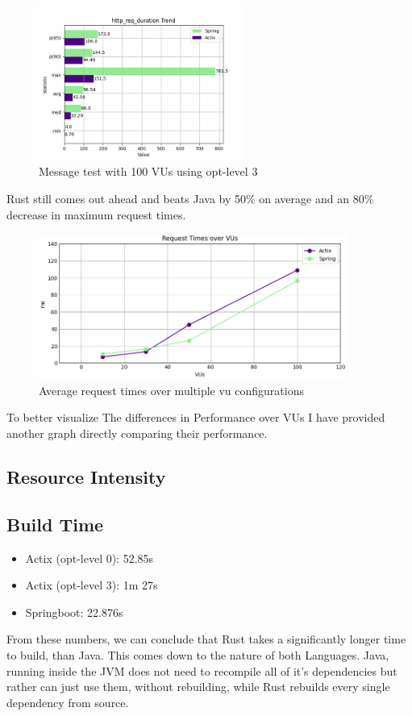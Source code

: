 \documentclass[a4paper,12pt]{article}
\begin{document}
	\clearpage
	\newpage
	\begin{figure}[ht!]
		\begin{center}
			\includegraphics[width=0.6\textwidth]{messages_100_opt_3/http_req_duration.png}
			\caption{Message test with 100 VUs using opt-level 3}
		\end{center}
	\end{figure}
	Rust still comes out ahead and beats Java by 50\% on average and an 80\% decrease in maximum request times.
	
	\begin{figure}[h]
		\begin{center}
			\includegraphics[width=0.9\textwidth]{requests_over_time.png}
			\caption{Average request times over multiple vu configurations}
		\end{center}
	\end{figure}
	To better visualize The differences in Performance over VUs I have provided another graph directly comparing their performance.
	\newpage
	\clearpage

	\subsection{Resource Intensity}
	\label{subsec:resource_intensity}
	\subsection*{Build Time}
	\begin{itemize}
		\item Actix (opt-level 0): 52.85s
		\item Actix (opt-level 3): 1m 27s
		\item Springboot: 22.876s
	\end{itemize}
	From these numbers, we can conclude that Rust takes a significantly longer time to build, than Java. This comes down to the nature
	of both Languages. Java, running inside the JVM does not need to recompile all of it's dependencies but rather can just use them,
	without rebuilding, while Rust rebuilds every single dependency from source.
	
\end{document}
